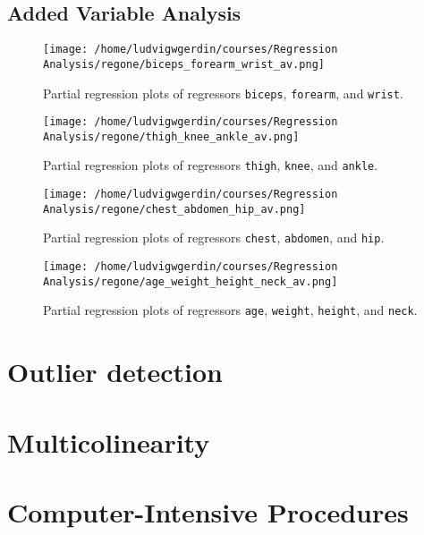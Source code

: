 \documentclass[11pt]{article}
\begin{document}
\subsection{Added Variable Analysis}
\label{sec:org16cdd9f}

\begin{figure}[htbp]
\centering
\texttt{[image: /home/ludvigwgerdin/courses/Regression Analysis/regone/biceps\_forearm\_wrist\_av.png]}
\caption{\label{fig:org355042e}
Partial regression plots of regressors \texttt{biceps}, \texttt{forearm}, and \texttt{wrist}.}
\end{figure}   

\begin{figure}[htbp]
\centering
\texttt{[image: /home/ludvigwgerdin/courses/Regression Analysis/regone/thigh\_knee\_ankle\_av.png]}
\caption{\label{fig:orgcb0c4ee}
Partial regression plots of regressors \texttt{thigh}, \texttt{knee}, and \texttt{ankle}.}
\end{figure}

\begin{figure}[htbp]
\centering
\texttt{[image: /home/ludvigwgerdin/courses/Regression Analysis/regone/chest\_abdomen\_hip\_av.png]}
\caption{\label{fig:orge3a03f5}
Partial regression plots of regressors \texttt{chest}, \texttt{abdomen}, and \texttt{hip}.}
\end{figure}

\begin{figure}[htbp]
\centering
\texttt{[image: /home/ludvigwgerdin/courses/Regression Analysis/regone/age\_weight\_height\_neck\_av.png]}
\caption{\label{fig:orgc2357aa}
Partial regression plots of regressors \texttt{age}, \texttt{weight}, \texttt{height}, and \texttt{neck}.}
\end{figure}

\section{Outlier detection}
\label{sec:orgbe586bc}
\section{Multicolinearity}
\label{sec:org9408461}
\section{Computer-Intensive Procedures}
\label{sec:orgb23a12f}
\end{document}
